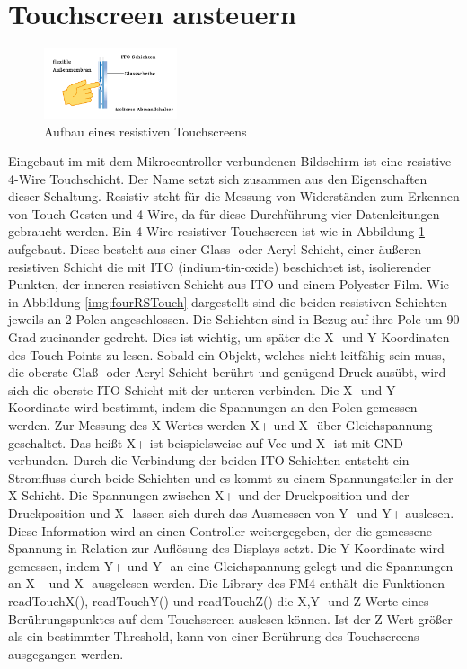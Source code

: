 \section{\ExercisePrefixEmbeddedC Touchscreen ansteuern \optional}
\begin{figure}[htbp]
	\centering
	\includegraphics[width=0.35\textwidth]{./05_c/figures/4WireRSTouch.png}
	\caption{Aufbau eines resistiven Touchscreens}
	\label{img:rsTouch}
\end{figure} \noindent
Eingebaut im mit dem Mikrocontroller verbundenen Bildschirm ist eine resistive 4-Wire Touchschicht. Der Name setzt sich zusammen aus den Eigenschaften dieser Schaltung. Resistiv steht f{\"u}r die Messung von Widerst{\"a}nden zum Erkennen von Touch-Gesten und 4-Wire, da f{\"u}r diese Durchf{\"u}hrung vier Datenleitungen gebraucht werden. Ein 4-Wire resistiver Touchscreen ist wie in Abbildung \ref{img:rsTouch} aufgebaut. Diese besteht aus einer Glass- oder Acryl-Schicht, einer {\"a}u{\ss}eren resistiven Schicht die mit ITO (indium-tin-oxide) beschichtet ist, isolierender Punkten, der inneren resistiven Schicht aus ITO und einem Polyester-Film. Wie in Abbildung \ref{img:fourRSTouch} dargestellt sind die beiden resistiven Schichten jeweils an 2 Polen angeschlossen. Die Schichten sind in Bezug auf ihre Pole um 90 Grad zueinander gedreht. Dies ist wichtig, um sp{\"a}ter die X- und Y-Koordinaten des Touch-Points zu lesen. Sobald ein Objekt, welches nicht leitf{\"a}hig sein muss, die oberste Gla{\ss}- oder Acryl-Schicht ber{\"u}hrt und gen{\"u}gend Druck aus{\"u}bt, wird sich die oberste ITO-Schicht mit der unteren verbinden. Die X- und Y-Koordinate wird bestimmt, indem die Spannungen an den Polen gemessen werden. Zur Messung des X-Wertes werden X+ und X- {\"u}ber Gleichspannung geschaltet. Das hei{\ss}t X+ ist beispielsweise auf Vcc und X- ist mit GND verbunden. Durch die Verbindung der beiden ITO-Schichten entsteht ein Stromfluss durch beide Schichten und es kommt zu einem Spannungsteiler in der X-Schicht. Die Spannungen zwischen X+ und der Druckposition und der Druckposition und X- lassen sich durch das Ausmessen von Y- und Y+ auslesen. Diese Information wird an einen Controller weitergegeben, der die gemessene Spannung in Relation zur Aufl{\"o}sung des Displays setzt. Die Y-Koordinate wird gemessen, indem Y+ und Y- an eine Gleichspannung gelegt und die Spannungen an X+ und X- ausgelesen werden. Die Library des FM4 enthält die Funktionen readTouchX(), readTouchY() und readTouchZ() die X,Y- und Z-Werte eines Berührungspunktes auf dem Touchscreen auslesen können. Ist der Z-Wert größer als ein bestimmter Threshold, kann von einer Berührung des Touchscreens ausgegangen werden. 
